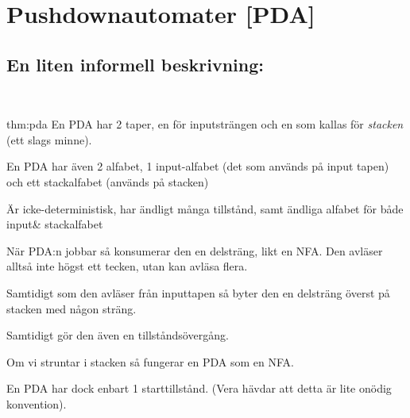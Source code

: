 \section{Pushdownautomater [PDA]}\par
\subsection{En liten informell beskrivning:}\hfill\\
\par\bigskip
\begin{theo}[PDA]{thm:pda}
  En PDA har 2 taper, en för inputsträngen och en som kallas för \textit{stacken} (ett slags minne).\par
  \noindent En PDA har även 2 alfabet, 1 input-alfabet (det som används på input tapen) och ett stackalfabet (används på stacken)
  \par\bigskip
  \noindent Är icke-deterministisk, har ändligt många tillstånd, samt ändliga alfabet för både input\& stackalfabet 
\end{theo}
\par\bigskip
\noindent När PDA:n jobbar så konsumerar den en delsträng, likt en NFA. Den avläser alltså inte högst ett tecken, utan kan avläsa flera.\par
\noindent Samtidigt som den avläser från inputtapen så byter den en delsträng överst på stacken med någon sträng.\par
\noindent Samtidigt gör den även en tillståndsövergång.
\par\bigskip
\noindent Om vi struntar i stacken så fungerar en PDA som en NFA.
\par\bigskip
\noindent En PDA har dock enbart 1 starttillstånd. (Vera hävdar att detta är lite onödig konvention).
\par\bigskip
